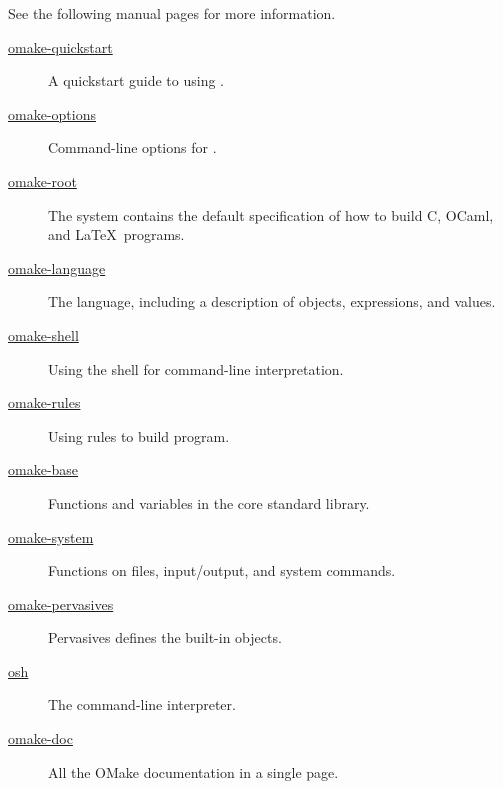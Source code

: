 %
See the following manual pages for more information.

\begin{description}
\item[\href{omake-quickstart.html}{omake-quickstart}]
%
   A quickstart guide to using .
\item[\href{omake-options.html}{omake-options}]
%
   Command-line options for .
\item[\href{omake-root.html}{omake-root}]
%
   The system  contains the default specification of how to build C, OCaml, and
   \LaTeX\ programs.
\item[\href{omake-language.html}{omake-language}]
%
   The  language, including a description of objects, expressions, and values.
\item[\href{omake-shell.html}{omake-shell}]
%
   Using the  shell for command-line interpretation.
\item[\href{omake-rules.html}{omake-rules}]
%
   Using  rules to build program.
\item[\href{omake-base.html}{omake-base}]
%
   Functions and variables in the core standard library.
\item[\href{omake-system.html}{omake-system}]
%
   Functions on files, input/output, and system commands.
\item[\href{omake-pervasives.html}{omake-pervasives}]
%
   Pervasives defines the built-in objects.
\item[\href{osh.html}{osh}]
%
   The  command-line interpreter.
\item[\href{omake-doc.html}{omake-doc}]
%
   All the OMake documentation in a single page.
\end{description}

